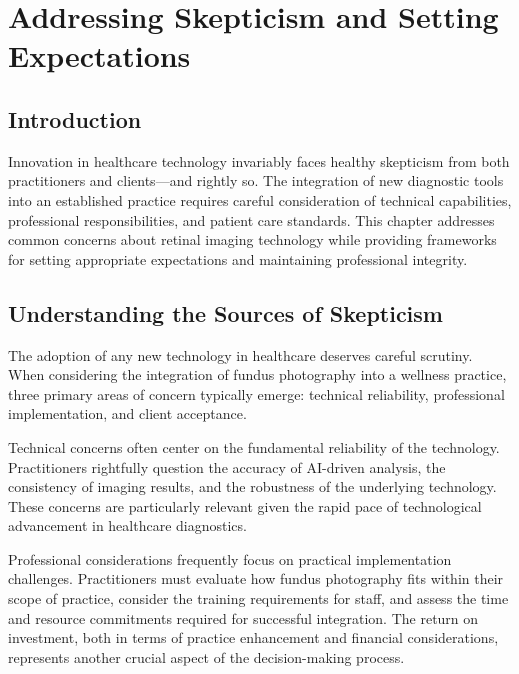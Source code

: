 \documentclass[
  Letterpaper,
]{scrbook}
\begin{document}

\chapter{Addressing Skepticism and Setting
Expectations}\label{addressing-skepticism-and-setting-expectations}

\section{Introduction}\label{introduction-3}

Innovation in healthcare technology invariably faces healthy skepticism
from both practitioners and clients---and rightly so. The integration of
new diagnostic tools into an established practice requires careful
consideration of technical capabilities, professional responsibilities,
and patient care standards. This chapter addresses common concerns about
retinal imaging technology while providing frameworks for setting
appropriate expectations and maintaining professional integrity.

\section{Understanding the Sources of
Skepticism}\label{understanding-the-sources-of-skepticism}

The adoption of any new technology in healthcare deserves careful
scrutiny. When considering the integration of fundus photography into a
wellness practice, three primary areas of concern typically emerge:
technical reliability, professional implementation, and client
acceptance.

Technical concerns often center on the fundamental reliability of the
technology. Practitioners rightfully question the accuracy of AI-driven
analysis, the consistency of imaging results, and the robustness of the
underlying technology. These concerns are particularly relevant given
the rapid pace of technological advancement in healthcare diagnostics.

Professional considerations frequently focus on practical implementation
challenges. Practitioners must evaluate how fundus photography fits
within their scope of practice, consider the training requirements for
staff, and assess the time and resource commitments required for
successful integration. The return on investment, both in terms of
practice enhancement and financial considerations, represents another
crucial aspect of the decision-making process.
\end{document}
